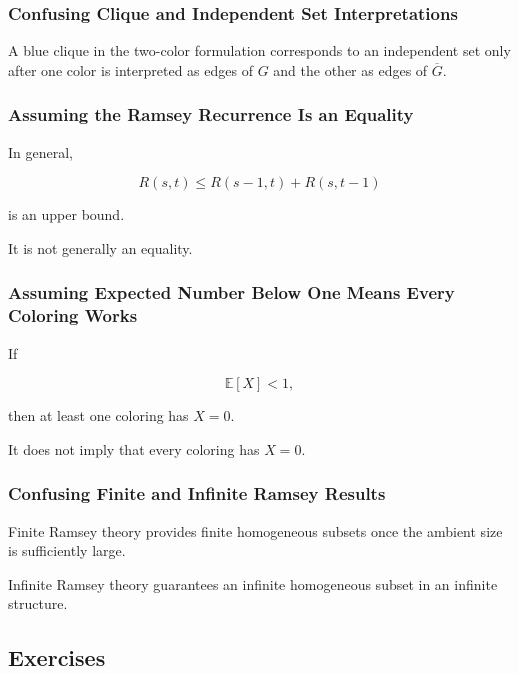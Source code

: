 \subsubsection{Confusing Clique and Independent Set Interpretations}

A blue clique in the two-color formulation corresponds to an independent
set only after one color is interpreted as edges of \(G\) and the other
as edges of \(\overline{G}\).

\subsubsection{Assuming the Ramsey Recurrence Is an Equality}

In general,

\[
R(s,t)
\leq
R(s-1,t)+R(s,t-1)
\]

is an upper bound.

It is not generally an equality.

\subsubsection{Assuming Expected Number Below One Means Every Coloring Works}

If

\[
\mathbb{E}[X]<1,
\]

then at least one coloring has \(X=0\).

It does not imply that every coloring has \(X=0\).

\subsubsection{Confusing Finite and Infinite Ramsey Results}

Finite Ramsey theory provides finite homogeneous subsets once the
ambient size is sufficiently large.

Infinite Ramsey theory guarantees an infinite homogeneous subset in an
infinite structure.

\subsection{Exercises}
\label{subsec:ramsey-theory-exercises}

